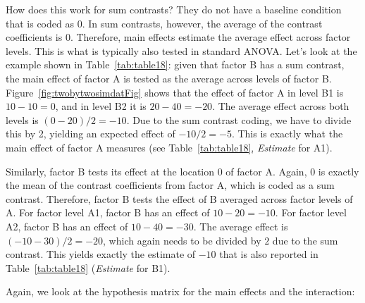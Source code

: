 \documentclass[12pt,]{krantz}
\begin{document}
How does this work for sum contrasts? They do not have a baseline condition that is coded as \(0\). In sum contrasts, however, the average of the contrast coefficients is \(0\). Therefore, main effects estimate the average effect across factor levels. This is what is typically also tested in standard ANOVA. Let's look at the example shown in Table~\ref{tab:table18}: given that factor B has a sum contrast, the main effect of factor A is tested as the average across levels of factor B. Figure~\ref{fig:twobytwosimdatFig} shows that the effect of factor A in level B1 is \(10 - 10 = 0\), and in level B2 it is \(20 - 40 = -20\). The average effect across both levels is \((0 - 20)/2 = -10\). Due to the sum contrast coding, we have to divide this by 2, yielding an expected effect of \(-10 / 2 = -5\). This is exactly what the main effect of factor A measures (see Table~\ref{tab:table18}, \emph{Estimate} for A1).

Similarly, factor B tests its effect at the location \(0\) of factor A. Again, \(0\) is exactly the mean of the contrast coefficients from factor A, which is coded as a sum contrast. Therefore, factor B tests the effect of B averaged across factor levels of A. For factor level A1, factor B has an effect of \(10 - 20 = -10\). For factor level A2, factor B has an effect of \(10 - 40 = -30\). The average effect is \((-10 - 30)/2 = -20\), which again needs to be divided by \(2\) due to the sum contrast. This yields exactly the estimate of \(-10\) that is also reported in Table~\ref{tab:table18} (\emph{Estimate} for B1).

Again, we look at the hypothesis matrix for the main effects and the interaction:
\end{document}
